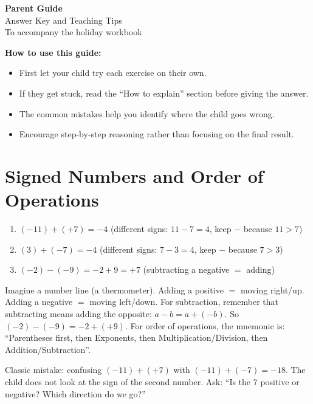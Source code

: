 \documentclass[11pt,a4paper]{article}
\newcommand{\corrbox}[1]{
\begin{tcolorbox}[colback=correctgreen!8!white,colframe=correctgreen!60!black]
#1
\end{tcolorbox}
}
\newcommand{\tipbox}[1]{
\begin{tcolorbox}[colback=tipblue!8!white,colframe=tipblue!60!black,title=\textbf{How to explain}]
#1
\end{tcolorbox}
}
\newcommand{\warnbox}[1]{
\begin{tcolorbox}[colback=warnred!8!white,colframe=warnred!60!black,title=\textbf{Common mistakes}]
#1
\end{tcolorbox}
}
\begin{document}
\begin{center}
{\LARGE \textbf{Parent Guide}}\\[0.3cm]
{\large Answer Key and Teaching Tips}\\[0.2cm]
{\normalsize To accompany the holiday workbook}
\end{center}

\vspace{0.5cm}

\textbf{How to use this guide:}
\begin{itemize}
\item First let your child try each exercise on their own.
\item If they get stuck, read the ``How to explain'' section before giving the answer.
\item The common mistakes help you identify where the child goes wrong.
\item Encourage step-by-step reasoning rather than focusing on the final result.
\end{itemize}

\section{Signed Numbers and Order of Operations}

\corrbox{
\begin{enumerate}
\item $(-11) + (+7) = -4$ \quad (different signs: $11 - 7 = 4$, keep $-$ because $11 > 7$)
\item $(3) + (-7) = -4$ \quad (different signs: $7 - 3 = 4$, keep $-$ because $7 > 3$)
\item $(-2) - (-9) = -2 + 9 = +7$ \quad (subtracting a negative $=$ adding)
\end{enumerate}
}

\tipbox{
Imagine a number line (a thermometer). Adding a positive $=$ moving right/up. Adding a negative $=$ moving left/down. For subtraction, remember that subtracting means adding the opposite: $a - b = a + (-b)$. So $(-2) - (-9) = -2 + (+9)$. For order of operations, the mnemonic is: ``Parentheses first, then Exponents, then Multiplication/Division, then Addition/Subtraction''.
}

\warnbox{
Classic mistake: confusing $(-11) + (+7)$ with $(-11) + (-7) = -18$. The child does not look at the sign of the second number. Ask: ``Is the $7$ positive or negative? Which direction do we go?''
}
\end{document}
